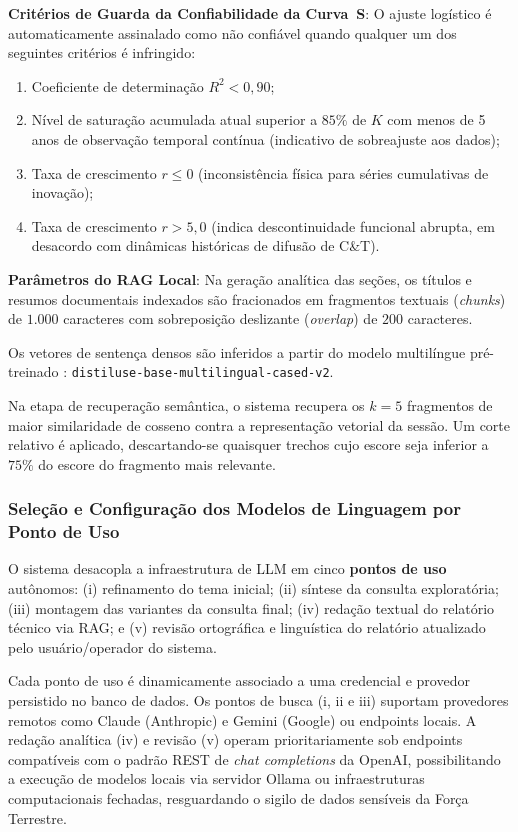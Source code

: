 \documentclass[12pt, a4paper]{article}
\begin{document}
  \textbf{Critérios de Guarda da Confiabilidade da Curva~S}: O ajuste logístico é automaticamente assinalado como não confiável quando qualquer um dos seguintes critérios é infringido:
  \begin{enumerate}[label=(\roman*)]
    \item Coeficiente de determinação $R^2 < 0{,}90$;
    \item Nível de saturação acumulada atual superior a $85\%$ de $K$ com menos de 5 anos de observação temporal contínua (indicativo de sobreajuste aos dados);
    \item Taxa de crescimento $r \le 0$ (inconsistência física para séries cumulativas de inovação);
    \item Taxa de crescimento $r > 5{,}0$ (indica descontinuidade funcional abrupta, em desacordo com dinâmicas históricas de difusão de C\&T).
  \end{enumerate}

  \textbf{Parâmetros do RAG Local}: Na geração analítica das seções, os títulos e resumos documentais indexados são fracionados em fragmentos textuais (\textit{chunks}) de $1.000$ caracteres com sobreposição deslizante (\textit{overlap}) de $200$ caracteres.

  Os vetores de sentença densos são inferidos a partir do modelo multilíngue pré-treinado \cite{reimers2019}: \texttt{distiluse-base-multilingual-cased-v2}.

  Na etapa de recuperação semântica, o sistema recupera os $k=5$ fragmentos de maior similaridade de cosseno contra a representação vetorial da sessão. Um corte relativo é aplicado, descartando-se quaisquer trechos cujo escore seja inferior a $75\%$ do escore do fragmento mais relevante.

    \subsubsection{Seleção e Configuração dos Modelos de Linguagem por Ponto de Uso}
    \label{sec:config-llm}

  O sistema desacopla a infraestrutura de LLM em cinco \textbf{pontos de uso} autônomos: (i) refinamento do tema inicial; (ii) síntese da consulta exploratória; (iii) montagem das variantes da consulta final; (iv) redação textual do relatório técnico via RAG; e (v) revisão ortográfica e linguística do relatório atualizado pelo usuário/operador do sistema. 

  Cada ponto de uso é dinamicamente associado a uma credencial e provedor persistido no banco de dados. Os pontos de busca (i, ii e iii) suportam provedores remotos como Claude (Anthropic) e Gemini (Google) ou endpoints locais. A redação analítica (iv) e revisão (v) operam prioritariamente sob endpoints compatíveis com o padrão REST de \textit{chat completions} da OpenAI, possibilitando a execução de modelos locais via servidor Ollama ou infraestruturas computacionais fechadas, resguardando o sigilo de dados sensíveis da Força Terrestre.
\end{document}
